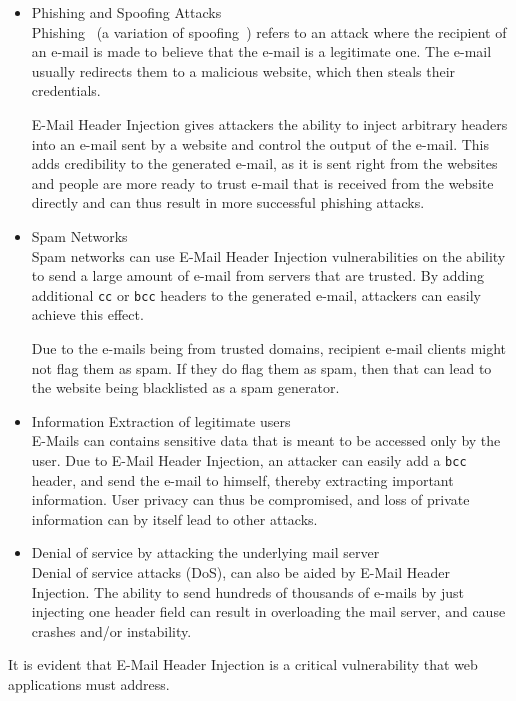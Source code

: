 \begin{itemize}
	\item Phishing and Spoofing Attacks\\
    Phishing~\cite{phishing} (a variation of spoofing~\cite{spoofing_attack}) refers to an attack where the recipient of an e-mail is made to believe that the e-mail is a legitimate one. The e-mail usually redirects them to a malicious website, which then steals their credentials. 
    
    E-Mail Header Injection gives attackers the ability to inject arbitrary headers into an e-mail sent by a website and control the output of the e-mail. This adds credibility to the generated e-mail, as it is sent right from the websites and people are more ready to trust e-mail that is received from the website directly and can thus result in more successful phishing attacks.
	
	\item Spam Networks\\
	Spam networks can use E-Mail Header Injection vulnerabilities on the ability to send a large amount of e-mail from servers that are trusted. By adding additional \texttt{cc} or \texttt{bcc} headers to the generated e-mail, attackers can easily achieve this effect. 
	
	Due to the e-mails being from trusted domains, recipient e-mail clients might not flag them as spam. If they do flag them as spam, then that can lead to the website being blacklisted as a spam generator. 
	
	\item Information Extraction of legitimate users\\
	E-Mails can contains sensitive data that is meant to be accessed only by the user. Due to E-Mail Header Injection, an attacker can easily add a \texttt{bcc} header, and send the e-mail to himself, thereby extracting important information.
	User privacy can thus be compromised, and loss of private information can by itself lead to other attacks.
	
	\item Denial of service by attacking the underlying mail server\\
    Denial of service attacks (DoS), can also be aided by E-Mail Header Injection. The ability to send hundreds of thousands of e-mails by just injecting one header field can result in overloading the mail server, and cause crashes and/or instability. 
\end{itemize}

It is evident that E-Mail Header Injection is a critical vulnerability that web applications must address.